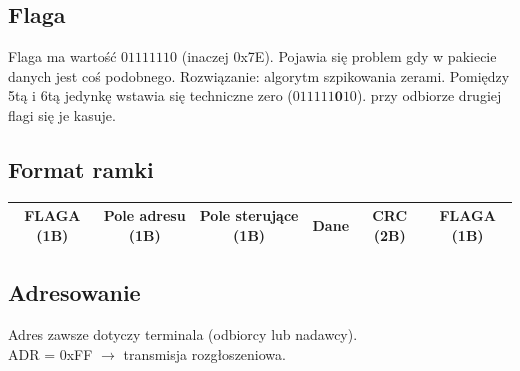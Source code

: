		\subsection{Flaga}
			Flaga ma wartość $ 01111110 $ (inaczej 0x7E). Pojawia się problem gdy w pakiecie danych jest coś podobnego. Rozwiązanie: algorytm szpikowania zerami. Pomiędzy 5tą i 6tą jedynkę wstawia się techniczne zero ($ 011111\textbf{0}10 $). przy odbiorze drugiej flagi się je kasuje.
		\subsection{Format ramki}
			\begin{table}[h]
				\begin{tabular}{|c|c|c|c|c|c|}
					\hline
					FLAGA (1B)	&	Pole adresu (1B)	&	Pole sterujące (1B)	&	Dane	&	CRC (2B)	& FLAGA (1B)	\\ \hline
				\end{tabular}
			\end{table}
		\subsection{Adresowanie}
			Adres zawsze dotyczy terminala (odbiorcy lub nadawcy).\\
			ADR = 0xFF $ \longrightarrow $ transmisja rozgłoszeniowa.
